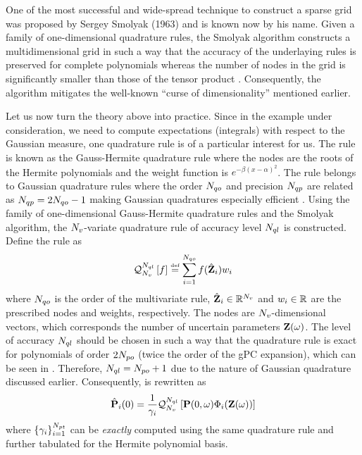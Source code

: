 One of the most successful and wide-spread technique to construct a sparse grid was proposed by Sergey Smolyak (1963) and is known now by his name. Given a family of one-dimensional quadrature rules, the Smolyak algorithm constructs a multidimensional grid in such a way that the accuracy of the underlaying rules is preserved for complete polynomials whereas the number of nodes in the grid is significantly smaller than those of the tensor product \cite{heiss2008, eldred2009}. Consequently, the algorithm mitigates the well-known ``curse of dimensionality'' mentioned earlier.

Let us now turn the theory above into practice. Since in the example under consideration, we need to compute expectations (integrals) with respect to the Gaussian measure, one quadrature rule is of a particular interest for us. The rule is known as the Gauss-Hermite quadrature rule where the nodes are the roots of the Hermite polynomials and the weight function is $e^{-\beta (x - \alpha)^2}$. The rule belongs to Gaussian quadrature rules where the order $N_{qo}$ and precision $N_{qp}$ are related as $N_{qp} = 2 N_{qo} - 1$ making Gaussian quadratures especially efficient \cite{heiss2008}. Using the family of one-dimensional Gauss-Hermite quadrature rules and the Smolyak algorithm, the ${N_v}$-variate quadrature rule of accuracy level $N_{ql}$ is constructed. Define the rule as
\[
  \mathcal{Q}_{{N_v}}^{N_{ql}}\left[f\right] \stackrel{\text{\tiny def}}{=} \sum_{i = 1}^{N_{qo}} f(\hat{\mathbf{Z}}_i) w_i
\]
where $N_{qo}$ is the order of the multivariate rule, $\hat{\mathbf{Z}}_i \in \mathbb{R}^{N_v}$ and $w_i \in \mathbb{R}$ are the prescribed nodes and weights, respectively. The nodes are ${N_v}$-dimensional vectors, which corresponds the number of uncertain parameters $\mathbf{Z}(\omega)$. The level of accuracy $N_{ql}$ should be chosen in such a way that the quadrature rule is exact for polynomials of order $2 {N_{po}}$ (twice the order of the gPC expansion), which can be seen in . Therefore, $N_{ql} = {N_{po}} + 1$ due to the nature of Gaussian quadrature discussed earlier. Consequently,  is rewritten as
\[
  \hat{\mathbf{P}}_i(0) = \frac{1}{\gamma_i} \mathcal{Q}_{{N_v}}^{N_{ql}}\left[\mathbf{P}(0, \omega) \Phi_i(\mathbf{Z}(\omega))\right]
\]
where $\{ \gamma_i \}_{i = 1}^{{N_{pt}}}$ can be \emph{exactly} computed using the same quadrature rule and further tabulated for the Hermite polynomial basis.
